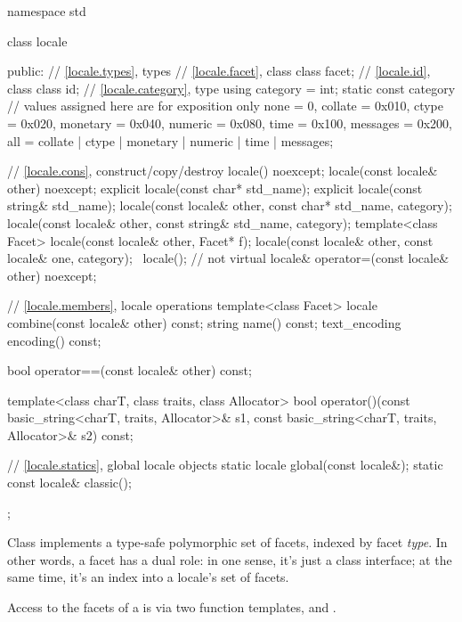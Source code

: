 \begin{codeblock}
namespace std {
  class locale {
  public:
    // \ref{locale.types}, types
    // \ref{locale.facet}, class 
    class facet;
    // \ref{locale.id}, class 
    class id;
    // \ref{locale.category}, type 
    using category = int;
    static const category   // values assigned here are for exposition only
      none     = 0,
      collate  = 0x010, ctype    = 0x020,
      monetary = 0x040, numeric  = 0x080,
      time     = 0x100, messages = 0x200,
      all = collate | ctype | monetary | numeric | time | messages;

    // \ref{locale.cons}, construct/copy/destroy
    locale() noexcept;
    locale(const locale& other) noexcept;
    explicit locale(const char* std_name);
    explicit locale(const string& std_name);
    locale(const locale& other, const char* std_name, category);
    locale(const locale& other, const string& std_name, category);
    template<class Facet> locale(const locale& other, Facet* f);
    locale(const locale& other, const locale& one, category);
    ~locale();                  // not virtual
    locale& operator=(const locale& other) noexcept;

    // \ref{locale.members}, locale operations
    template<class Facet> locale combine(const locale& other) const;
    string name() const;
    text_encoding encoding() const;

    bool operator==(const locale& other) const;

    template<class charT, class traits, class Allocator>
      bool operator()(const basic_string<charT, traits, Allocator>& s1,
                      const basic_string<charT, traits, Allocator>& s2) const;

    // \ref{locale.statics}, global locale objects
    static       locale  global(const locale&);
    static const locale& classic();
  };
}
\end{codeblock}

\pnum
Class  implements a type-safe polymorphic set of facets,
indexed by facet \textit{type}.
In other words, a facet has a dual role:
in one sense, it's just a class interface;
at the same time, it's an index into a locale's set of facets.

\pnum
Access to the facets of a  is via two function templates,
 and .


